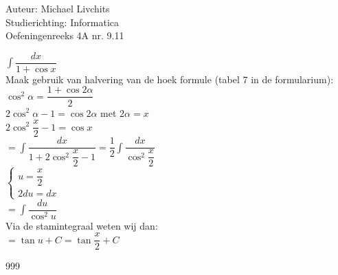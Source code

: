 \documentclass[a4paper]{article}
\begin{document}
  
\noindent \large Auteur: Michael Livchits \\
\noindent \large Studierichting: Informatica\\
\noindent \large Oefeningenreeks 4A nr. 9.11\\

\medskip

\normalsize

$\displaystyle\int\dfrac{dx}{1+\cos x}$\\

Maak gebruik van halvering van de hoek formule (tabel 7 in de formularium):\\

$\cos^2\alpha = \dfrac{1+\cos2\alpha}{2}$\\

$2\cos^2\alpha - 1 = \cos2\alpha$ met $2\alpha = x$\\

$2\cos^2\dfrac{x}{2} - 1 = \cos x$\\

$= \displaystyle\int\dfrac{dx}{1+2\cos^2\dfrac{x}{2} - 1} = \dfrac{1}{2}\displaystyle\int\dfrac{dx}{\cos^2\dfrac{x}{2}}$\\

$\left\{
\begin{array}{l}
	u = \dfrac{x}{2}\\
	2du =  dx
\end{array}
\right .$\\

$= \displaystyle\int\dfrac{du}{\cos^2u}$\\

Via de stamintegraal weten wij dan:\\

$= \tan u + C = \tan\dfrac{x}{2} + C$\\

\begin{thebibliography}{999}
\end{thebibliography}
\end{document}
